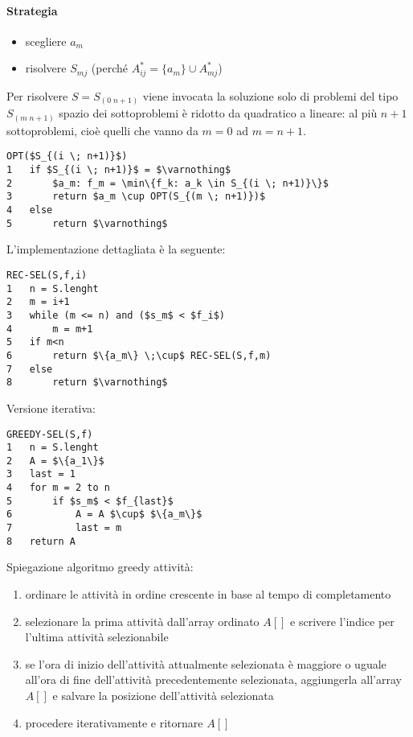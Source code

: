 \paragraph{Strategia}
\begin{itemize}
    \item scegliere $a_m$
    \item risolvere $S_{mj}$ \quad (perché $A_{ij}^* = \{a_m\} \cup A_{mj}^*$)
\end{itemize}
Per risolvere $S = S_{(0 \; n+1)}$ viene invocata la soluzione solo di problemi del tipo $S_{(m \; n + 1)}$ spazio dei sottoproblemi è ridotto da quadratico a lineare: al più $n+1$ sottoproblemi, cioè quelli che vanno da $m=0$ ad $m = n+1$.
\begin{mdframed}
\begin{lstlisting}[mathescape=true]
OPT($S_{(i \; n+1)}$)
1   if $S_{(i \; n+1)}$ = $\varnothing$
2       $a_m: f_m = \min\{f_k: a_k \in S_{(i \; n+1)}\}$
3       return $a_m \cup OPT(S_{(m \; n+1)})$
4   else
5       return $\varnothing$ 
\end{lstlisting}
\end{mdframed}
L'implementazione dettagliata è la seguente:
\begin{mdframed}
\begin{lstlisting}[mathescape=true]
REC-SEL(S,f,i)
1   n = S.lenght
2   m = i+1
3   while (m <= n) and ($s_m$ < $f_i$)
4       m = m+1
5   if m<n
6       return $\{a_m\} \;\cup$ REC-SEL(S,f,m)
7   else
8       return $\varnothing$
\end{lstlisting}
\end{mdframed}
Versione iterativa:
\begin{mdframed}
\begin{lstlisting}[mathescape=true]
GREEDY-SEL(S,f)
1   n = S.lenght
2   A = $\{a_1\}$
3   last = 1
4   for m = 2 to n
5       if $s_m$ < $f_{last}$
6           A = A $\cup$ $\{a_m\}$
7           last = m
8   return A
\end{lstlisting}
\end{mdframed}
Spiegazione algoritmo greedy attività:
\begin{enumerate}
    \item ordinare le attività in ordine crescente in base al tempo di completamento
    \item selezionare la prima attività dall'array ordinato $A[]$ e scrivere l'indice per l'ultima attività selezionabile
    \item se l'ora di inizio dell'attività attualmente selezionata è maggiore o uguale all'ora di fine dell'attività precedentemente selezionata, aggiungerla all'array $A[]$ e salvare la posizione dell'attività selezionata
    \item procedere iterativamente e ritornare $A[]$
\end{enumerate}

